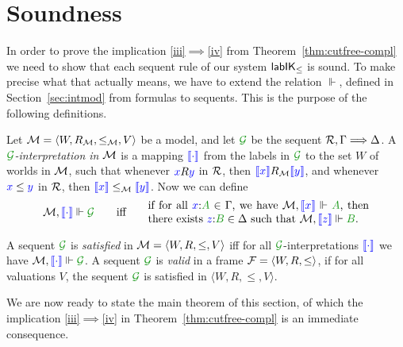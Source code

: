 
\section{Soundness}\label{sec:soundness}

In order to prove the implication \ref{iii}$\implies$\ref{iv} from
Theorem~\ref{thm:cutfree-compl} we need to show that each sequent rule
of our system $\mathsf{lab}\mathsf{IK}_{\le}$ is sound. To make precise what that actually
means, we have to extend the relation $\Vdash$, defined in
Section~\ref{sec:intmod} from formulas to sequents. This is the
purpose of the following definitions.

\begin{definition}\label{def:force-seq}
	Let $\mathcal{M} = \langle W, R_{\mathcal{M}}, \le_{\mathcal{M}}, V \rangle$ be a model, and let
	$\SG$ be the sequent $\mathcal{R} , \Gamma \Longrightarrow \Delta$. 
	A \emph{$\SG$-interpretation
		in $\mathcal{M}$} is a mapping ${\color{blue}{\llbracket \cdot\rrbracket}}$ from the labels in $\SG$ to the set $W$ of worlds in $\mathcal{M}$, such that whenever ${\color{blue}{x}}R{\color{blue}{y}}$ in $\mathcal{R}$, then ${\color{blue}{\llbracket x\rrbracket}}R_{\mathcal{M}}{\color{blue}{\llbracket y\rrbracket}}$, and whenever ${\color{blue}{x}}\le{{\color{blue}{y}}}$ in $\mathcal{R}$, then ${\color{blue}{\llbracket x\rrbracket}}\le_{\mathcal{M}}{\color{blue}{\llbracket y\rrbracket}}$. Now we can define 
	\begin{equation}
	\M,\inter\cdot\Vdash\SG\qquad\mbox{iff}\qquad
	\parbox{20em}{if for all $\labels{x}{A} \in \Gamma$, we have $\M, \inter x \Vdash \fm A$, then there exists $\labels{z}{B} \in \Delta$ such that $\M, \inter z \Vdash \fm B$.}
	\end{equation}
\end{definition}

\begin{definition}\label{def:valid-seq}
	A sequent $\SG$ is \emph{satisfied} in $\mathcal{M} = \langle W, R, \le, V
	\rangle$ iff for all $\SG$-interpretations ${\color{blue}{\llbracket \cdot\rrbracket}}$ we have
	$\M,\inter\cdot\Vdash\SG$.
	A sequent $\SG$ is \emph{valid} in a frame $\mathcal{F} = \langle W, R,
	\le \rangle$, if for all valuations $V$, the sequent $\SG$ is
	satisfied in $\langle W, R, \le, V \rangle$.
\end{definition}

We are now ready to state the main theorem of this section, of which
the implication \ref{iii}$\implies$\ref{iv} in
Theorem~\ref{thm:cutfree-compl} is an immediate consequence.

